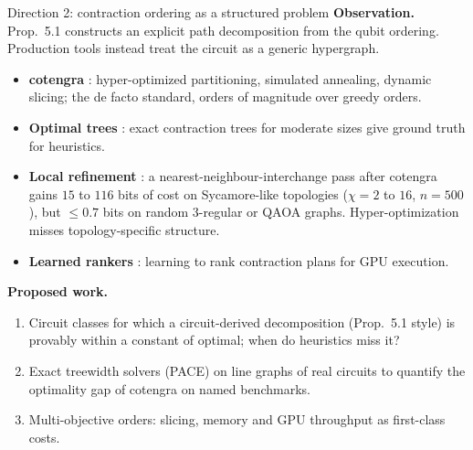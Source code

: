 \begin{frame}{Direction 2: contraction ordering as a structured problem}
    \textbf{Observation.} Prop.~5.1 constructs an explicit path decomposition from the qubit ordering. Production tools instead treat the circuit as a generic hypergraph.
    \begin{itemize}
        \item \textbf{cotengra} \parencite{gray2021hyper}: hyper-optimized partitioning, simulated annealing, dynamic slicing; the de facto standard, orders of magnitude over greedy orders.
        \item \textbf{Optimal trees} \parencite{optimaltrees2022}: exact contraction trees for moderate sizes give ground truth for heuristics.
        \item \textbf{Local refinement} \parencite{localrefine2026}: a nearest-neighbour-interchange pass after cotengra gains $15$ to $116$ bits of cost on Sycamore-like topologies ($\chi=2$ to $16$, $n=500$), but $\le 0.7$ bits on random 3-regular or QAOA graphs. Hyper-optimization misses topology-specific structure.
        \item \textbf{Learned rankers} \parencite{learnrank2026}: learning to rank contraction plans for GPU execution.
    \end{itemize}
    \textbf{Proposed work.}
    \begin{enumerate}
        \item Circuit classes for which a circuit-derived decomposition (Prop.~5.1 style) is provably within a constant of optimal; when do heuristics miss it?
        \item Exact treewidth solvers (PACE) on line graphs of real circuits to quantify the optimality gap of cotengra on named benchmarks.
        \item Multi-objective orders: slicing, memory and GPU throughput as first-class costs.
    \end{enumerate}
\end{frame}

